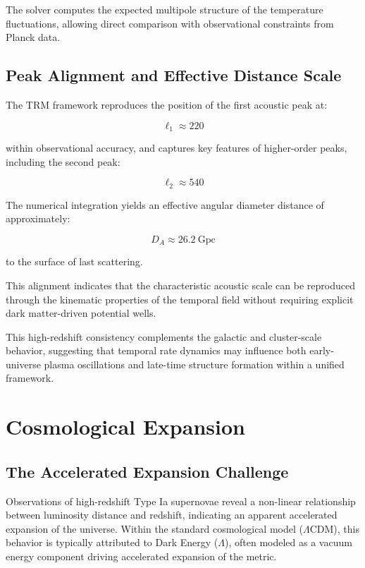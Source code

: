 \documentclass[11pt]{article}
\begin{document}
	The solver computes the expected multipole structure of the temperature fluctuations, allowing direct comparison with observational constraints from Planck data.

	\subsection{Peak Alignment and Effective Distance Scale}

	The TRM framework reproduces the position of the first acoustic peak at:

	\begin{equation}
		\ell_1 \approx 220
	\end{equation}

	within observational accuracy, and captures key features of higher-order peaks, including the second peak:

	\begin{equation}
		\ell_2 \approx 540
	\end{equation}

	The numerical integration yields an effective angular diameter distance of approximately:

	\begin{equation}
		D_A \approx 26.2\ \mathrm{Gpc}
	\end{equation}

	to the surface of last scattering.

	This alignment indicates that the characteristic acoustic scale can be reproduced through the kinematic properties of the temporal field without requiring explicit dark matter-driven potential wells.

	This high-redshift consistency complements the galactic and cluster-scale behavior, suggesting that temporal rate dynamics may influence both early-universe plasma oscillations and late-time structure formation within a unified framework.

	\section{Cosmological Expansion}

	\subsection{The Accelerated Expansion Challenge}

	Observations of high-redshift Type Ia supernovae reveal a non-linear relationship between luminosity distance and redshift, indicating an apparent accelerated expansion of the universe. Within the standard cosmological model ($\Lambda$CDM), this behavior is typically attributed to Dark Energy ($\Lambda$), often modeled as a vacuum energy component driving accelerated expansion of the metric.
\end{document}
